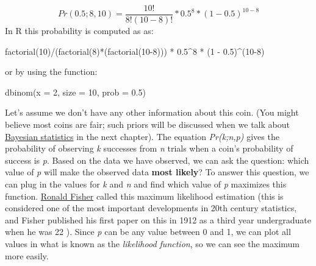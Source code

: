 \documentclass[
]{krantz}
\newenvironment{Shaded}{\begin{snugshade}}{\end{snugshade}}
\newcommand{\AttributeTok}[1]{\textcolor[rgb]{0.77,0.63,0.00}{#1}}
\newcommand{\DecValTok}[1]{\textcolor[rgb]{0.00,0.00,0.81}{#1}}
\newcommand{\FloatTok}[1]{\textcolor[rgb]{0.00,0.00,0.81}{#1}}
\newcommand{\FunctionTok}[1]{\textcolor[rgb]{0.00,0.00,0.00}{#1}}
\newcommand{\NormalTok}[1]{#1}
\newcommand{\SpecialCharTok}[1]{\textcolor[rgb]{0.00,0.00,0.00}{#1}}
\begin{document}
\[
Pr\left(0.5;8,10 \right) = \frac{10!}{8!\left( 10 - 8 \right)!}*0.5^{8}*{(1 - 0.5)}^{10 - 8}
\]
In R this probability is computed as as:

\begin{Shaded}
\begin{Highlighting}[]
\FunctionTok{factorial}\NormalTok{(}\DecValTok{10}\NormalTok{)}\SpecialCharTok{/}\NormalTok{(}\FunctionTok{factorial}\NormalTok{(}\DecValTok{8}\NormalTok{)}\SpecialCharTok{*}\NormalTok{(}\FunctionTok{factorial}\NormalTok{(}\DecValTok{10{-}8}\NormalTok{))) }\SpecialCharTok{*} \FloatTok{0.5}\SpecialCharTok{\^{}}\DecValTok{8} \SpecialCharTok{*}\NormalTok{ (}\DecValTok{1} \SpecialCharTok{{-}} \FloatTok{0.5}\NormalTok{)}\SpecialCharTok{\^{}}\NormalTok{(}\DecValTok{10{-}8}\NormalTok{)}
\end{Highlighting}
\end{Shaded}

or by using the function:

\begin{Shaded}
\begin{Highlighting}[]
\FunctionTok{dbinom}\NormalTok{(}\AttributeTok{x =} \DecValTok{2}\NormalTok{, }\AttributeTok{size =} \DecValTok{10}\NormalTok{, }\AttributeTok{prob =} \FloatTok{0.5}\NormalTok{)}
\end{Highlighting}
\end{Shaded}

Let's assume we don't have any other information about this coin. (You might believe most coins are fair; such priors will be discussed when we talk about \protect\hyperlink{bayes}{Bayesian statistics} in the next chapter). The equation \emph{Pr(k;n,p)} gives the probability of observing \emph{k} successes from \emph{n} trials when a coin's probability of success is \emph{p}. Based on the data we have observed, we can ask the question: which value of \emph{p} will make the observed data \textbf{most likely}? To answer this question, we can plug in the values for \emph{k} and \emph{n} and find which value of \emph{p} maximizes this function. \href{https://en.wikipedia.org/wiki/Ronald_Fisher}{Ronald Fisher} called this maximum likelihood estimation (this is considered one of the most important developments in 20th century statistics, and Fisher published his first paper on this in 1912 as a third year undergraduate when he was 22 \citep{aldrich_r_1997}). Since \emph{p} can be any value between 0 and 1, we can plot all values in what is known as the \emph{likelihood function}, so we can see the maximum more easily.
\end{document}
